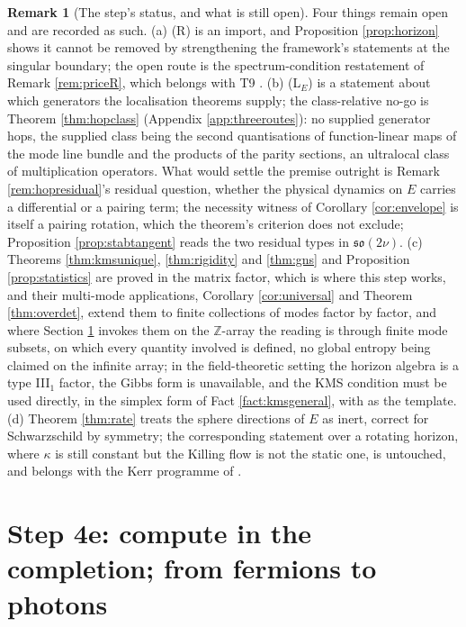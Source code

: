 \documentclass[11pt]{article}
\theoremstyle{definition}
\newtheorem{remark}[theorem]{Remark}
\begin{document}
\begin{remark}[The step's status, and what is still open]
Four things remain open and are recorded as such. (a) (R) is an import, and Proposition \ref{prop:horizon} shows it cannot be removed by strengthening the framework's statements at the singular boundary; the open route is the spectrum-condition restatement of Remark \ref{rem:priceR}, which belongs with T9 \cite{ButlerT9}. (b) (L$_E$) is a statement about which generators the localisation theorems supply; the class-relative no-go is Theorem \ref{thm:hopclass} (Appendix \ref{app:threeroutes}): no supplied generator hops, the supplied class being the second quantisations of function-linear maps of the mode line bundle and the products of the parity sections, an ultralocal class of multiplication operators. What would settle the premise outright is Remark \ref{rem:hopresidual}'s residual question, whether the physical dynamics on $E$ carries a differential or a pairing term; the necessity witness of Corollary \ref{cor:envelope} is itself a pairing rotation, which the theorem's criterion does not exclude; Proposition \ref{prop:stabtangent} reads the two residual types in $\mathfrak{so}(2\nu)$. (c) Theorems \ref{thm:kmsunique}, \ref{thm:rigidity} and \ref{thm:gns} and Proposition \ref{prop:statistics} are proved in the matrix factor, which is where this step works, and their multi-mode applications, Corollary \ref{cor:universal} and Theorem \ref{thm:overdet}, extend them to finite collections of modes factor by factor, and where Section \ref{sec:photons} invokes them on the $\mathbb{Z}$-array the reading is through finite mode subsets, on which every quantity involved is defined, no global entropy being claimed on the infinite array; in the field-theoretic setting the horizon algebra is a type III$_1$ factor, the Gibbs form is unavailable, and the KMS condition must be used directly, in the simplex form of Fact \ref{fact:kmsgeneral}, with \cite{KayWald1991} as the template. (d) Theorem \ref{thm:rate} treats the sphere directions of $E$ as inert, correct for Schwarzschild by symmetry; the corresponding statement over a rotating horizon, where $\kappa$ is still constant but the Killing flow is not the static one, is untouched, and belongs with the Kerr programme of \cite{ButlerT4, ButlerT6}.
\end{remark}

\section{Step 4e: compute in the completion; from fermions to photons}\label{sec:photons}
\end{document}
